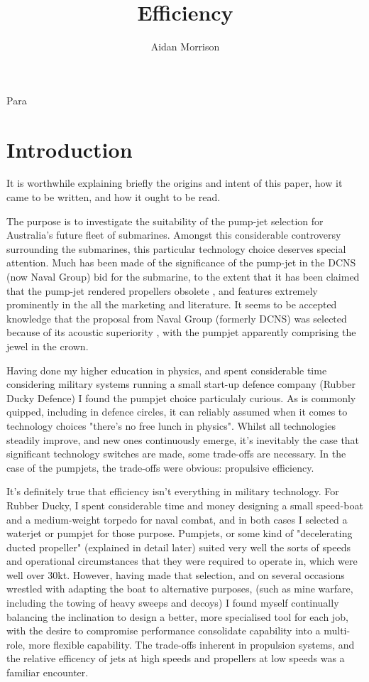 \documentclass{article}\usepackage[]{graphicx}\usepackage[]{color}
\title{Efficiency}
\author{Aidan Morrison}
\begin{document}
\maketitle




Para

\tableofcontents

\section{Introduction}

It is worthwhile explaining briefly the origins and intent of this paper, how it came to be written, and how it ought to be read.

The purpose is to investigate the suitability of the pump-jet selection for Australia's future fleet of submarines.  Amongst this considerable controversy surrounding the submarines, this particular technology choice deserves special attention.  Much has been made of the significance of the pump-jet in the DCNS (now Naval Group) bid for the submarine, to the extent that it has been claimed that the pump-jet rendered propellers obsolete \parencite{naval2018}, and features extremely prominently in the all the marketing and literature. It seems to be accepted knowledge that the proposal from Naval Group (formerly DCNS) was selected because of its acoustic superiority \parencite{stewart2016}, with the pumpjet apparently comprising the jewel in the crown.

Having done my higher education in physics, and spent considerable time considering military systems running a small start-up defence company (Rubber Ducky Defence) I found the pumpjet choice particulaly curious.  As is commonly quipped, including in defence circles, it can reliably assumed when it comes to technology choices "there's no free lunch in physics".  Whilst all technologies steadily improve, and new ones continuously emerge, it's inevitably the case that significant technology switches are made, some trade-offs are necessary. In the case of the pumpjets, the trade-offs were obvious: propulsive efficiency.

It's definitely true that efficiency isn't everything in military technology.  For Rubber Ducky, I spent considerable time and money designing a small speed-boat and a medium-weight torpedo for naval combat, and in both cases I selected a waterjet or pumpjet for those purpose. Pumpjets, or some kind of "decelerating ducted propeller" (explained in detail later) suited very well the sorts of speeds and operational circumstances that they were required to operate in, which were well over 30kt. However, having made that selection, and on several occasions wrestled with adapting the boat to alternative purposes, (such as mine warfare, including the towing of heavy sweeps and decoys) I found myself continually balancing the inclination to design a better, more specialised tool for each job, with the desire to compromise performance consolidate capability into a multi-role, more flexible capability.  The trade-offs inherent in propulsion systems, and the relative efficency of jets at high speeds and propellers at low speeds was a familiar encounter.
\end{document}
